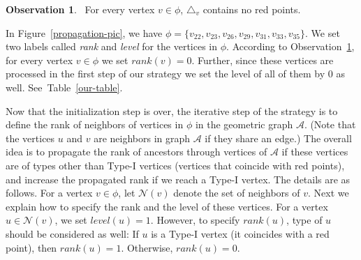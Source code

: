 \documentclass[a4paper,UKenglish]{lipics-v2018}
\theoremstyle{definition}
\newtheorem{observation}[theorem]{Observation}
\begin{document}
\begin{observation}~\label{empty-tri}
For every vertex $v \in \phi$, $\triangle_v$ contains no red points.
\end{observation}



In Figure~\ref{propagation-pic}, we have $\phi =\{v_{22}, v_{23}, v_{26}, v_{29}, v_{31}, v_{33}, v_{35}\}$. We set two labels called \emph{rank} and \emph{level} for the vertices in $\phi$.
According to Observation~\ref{empty-tri}, for every vertex $v \in \phi$ we set $rank(v)=0$. Further, since these vertices are processed in the first step of our strategy we set the level of all of them by $0$ as well. See~Table~\ref{our-table}.



Now that the initialization step is over, the iterative step of the strategy is to define the rank of neighbors of vertices in $\phi$ in the geometric graph $\mathcal{A}$. (Note that the vertices $u$ and $v$ are neighbors in graph $\mathcal A$ if they share an edge.) The overall idea is to propagate the rank of ancestors through vertices of $\mathcal A$ if these vertices are of types other than Type-I vertices (vertices that coincide with red points), and increase the propagated rank if we reach a Type-I vertex. The details are as follows.
For a vertex $v \in \phi$, let $\mathcal{N}(v)$ denote the set of  neighbors of $v$. Next we explain how to specify the rank and the level of these vertices.
For a vertex $u \in \mathcal{N}(v)$, we set $level(u)=1$. However, to specify $rank(u)$, type of $u$ should be considered as well:
If $u$ is a Type-I vertex (it coincides with a red point), then $rank(u)=1$. Otherwise, $rank(u)=0$.
\end{document}
